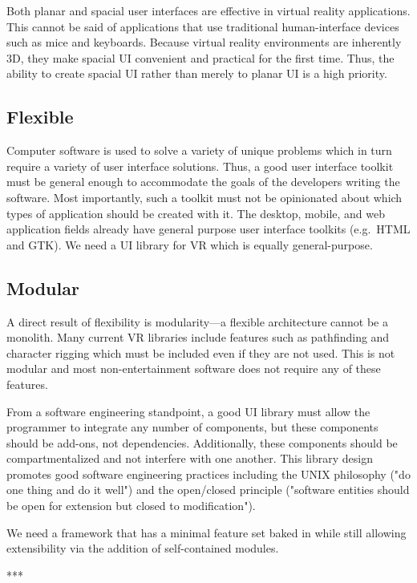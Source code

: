 \documentclass[conference,12pt]{IEEEtran}
\begin{document}
Both planar and spacial user interfaces are effective in virtual reality
applications. This cannot be said of applications that use traditional
human-interface devices such as mice and keyboards. Because virtual reality
environments are inherently 3D, they make spacial UI convenient and practical
for the first time. Thus, the ability to create spacial UI rather than merely to
planar UI is a high priority.

\subsection{Flexible}\label{sec:flexible}
Computer software is used to solve a variety of unique problems which in turn
require a variety of user interface solutions. Thus, a good user interface
toolkit must be general enough to accommodate the goals of the developers
writing the software. Most importantly, such a toolkit must not be opinionated
about which types of application should be created with it. The desktop, mobile,
and web application fields already have general purpose user interface toolkits
(e.g.\ HTML and GTK). We need a UI library for VR which is equally
general-purpose.

\subsection{Modular}\label{sec:modular}

A direct result of flexibility is modularity---a flexible architecture cannot be
a monolith. Many current VR libraries include features such as pathfinding and
character rigging which must be included even if they are not used. This is not
modular and most non-entertainment software does not require any of these
features.

From a software engineering standpoint, a good UI library must allow the
programmer to integrate any number of components, but these components should
be add-ons, not dependencies. Additionally, these components should be
compartmentalized and not interfere with one another. This library design
promotes good software engineering practices including the UNIX philosophy ("do
one thing and do it well") and the open/closed principle ("software entities
should be open for extension but closed to modification").

We need a framework that has a minimal feature set baked in while still allowing
extensibility via the addition of self-contained modules.

\begin{center}***\end{center}
\end{document}

